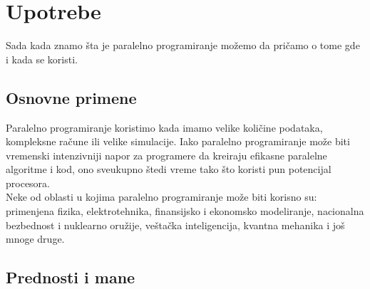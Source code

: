 \documentclass[a4paper]{article}
\begin{document}
	\section{Upotrebe}
Sada kada znamo šta je paralelno programiranje možemo da pričamo o tome gde i kada se koristi.
\subsection{Osnovne primene}

Paralelno programiranje koristimo kada imamo velike količine podataka, kompleksne račune ili velike simulacije. Iako paralelno programiranje može biti vremenski intenzivniji napor za programere da kreiraju efikasne paralelne algoritme i kod, ono sveukupno štedi vreme tako što koristi pun potencijal procesora.\\Neke od oblasti u kojima paralelno programiranje može biti korisno su: primenjena fizika, elektrotehnika, finansijsko i ekonomsko modeliranje,  nacionalna bezbednost i nuklearno oružije, veštačka inteligencija, kvantna mehanika\cite{totalview} i još mnoge druge.

\subsection{Prednosti i mane}
\end{document}
